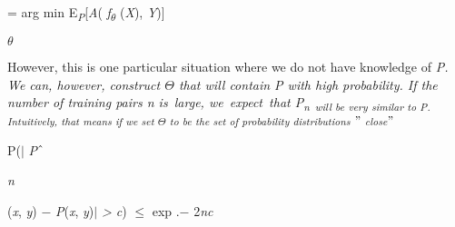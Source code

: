\documentclass[12pt,twoside]{article}
\begin{document}
\begin{adjustwidth}{0.85in}{0.52in}
\begin{Center}
{\fontsize{10pt}{12.0pt}\selectfont = arg min E\textit{\textsubscript{P}}[\textit{A}( \textit{f\textsubscript{$ \theta $ } }(\textit{X}), \textit{Y})]\par}
\end{Center}\par

\end{adjustwidth}

\begin{adjustwidth}{0.0in}{0.28in}
\begin{Center}
{\fontsize{7pt}{8.4pt}\selectfont \textit{$ \theta $ }\par}
\end{Center}\par

\end{adjustwidth}


\vspace{\baselineskip}

\vspace{\baselineskip}
\begin{adjustwidth}{0.08in}{0.58in}
{\fontsize{10pt}{12.0pt}\selectfont However, this is one particular situation where we do not have knowledge of \textit{P. We can, however, construct $ \Theta $  that will contain P with high probability. If the number of training pairs n is\ large,  we\  expect\ that  P\textsubscript{n\  will be very similar to P. Intuitively, that means if we set $ \Theta $  to be the set of probability distributions $"$ close$"$ }}\par}\par

\end{adjustwidth}


\vspace{\baselineskip}
\begin{adjustwidth}{0.95in}{0.0in}
\begin{FlushLeft}
{\fontsize{10pt}{12.0pt}\selectfont \uline{  \tabto{1.62in}  \tabto{2.03in} }P($ \vert $ \textit{P}$ \string^ $ {\fontsize{7pt}{8.4pt}\selectfont \textit{n}{\fontsize{10pt}{12.0pt}\selectfont (\textit{x}, \textit{y}) $-$  \textit{P}(\textit{x}, \textit{y})$ \vert $  \textit{> c}) $ \leq $  exp .$-$ 2\textit{nc}{\fontsize{7pt}{8.4pt}\par}\par}\par}\par}
\end{FlushLeft}\par

\end{adjustwidth}
\end{document}

